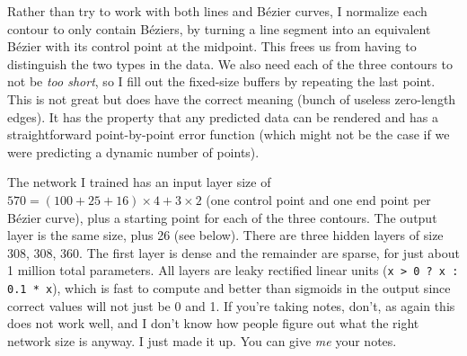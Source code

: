 \documentclass[twocolumn]{article} %
\begin{document}

Rather than try to work with both lines and B\'ezier curves, I
normalize each contour to only contain B\'eziers, by turning a line
segment into an equivalent B\'ezier with its control point at the
midpoint. This frees us from having to distinguish the two types in
the data. We also need each of the three contours to not be {\em too
  short}, so I fill out the fixed-size buffers by repeating the last
point. This is not great but does have the correct meaning (bunch of
useless zero-length edges). It has the property that any predicted
data can be rendered and has a straightforward point-by-point error
function (which might not be the case if we were predicting a dynamic
number of points).

The network I trained has an input layer size of $570 = (100 + 25 + 16)
\times 4 + 3 \times 2$ (one control point and one end point per
B\'ezier curve), plus a starting point for each of the three contours.
The output layer is the same size, plus 26 (see below). There are
three hidden layers of size 308, 308, 360. The first layer is dense
and the remainder are sparse,
for just about 1 million total parameters. All layers are leaky
rectified linear units ({\tt x > 0 ? x : 0.1 * x}), which is fast to
compute and better than sigmoids in the output since correct values
will not just be 0 and 1. If you're taking notes, don't, as again this
does not work well, and I don't know how people figure out what the
right network size is anyway. I just made it up. You can give {\em me}
your notes.
\end{document}
